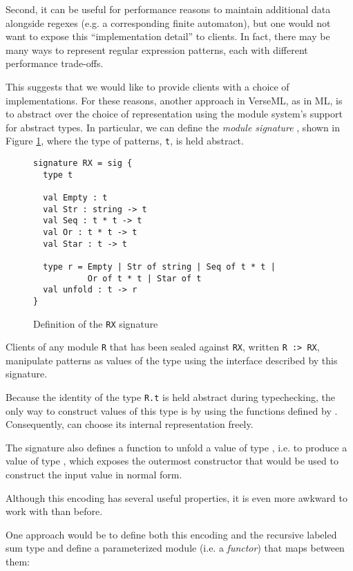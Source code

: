 {{Second, it can be useful for performance reasons to maintain additional data alongside regexes (e.g. a corresponding finite automaton), but one would not want to expose this ``implementation detail'' to clients. In fact, there may be many ways to represent regular expression patterns, each with different performance trade-offs.

This suggests that we would like to provide clients with a choice of implementations. For these reasons, another approach in VerseML, as in ML, is to abstract over the choice of representation using  the module system's support for abstract types. In particular, we can define the \emph{module signature} , shown in Figure \ref{fig:signature-RX}, where the type of patterns, \lstinline{t}, is held abstract.

\begin{figure}[ht]
\begin{lstlisting}[deletekeywords={case},numbers=none]
signature RX = sig {
  type t

  val Empty : t
  val Str : string -> t
  val Seq : t * t -> t
  val Or : t * t -> t
  val Star : t -> t

  type r = Empty | Str of string | Seq of t * t | 
           Or of t * t | Star of t
  val unfold : t -> r
}
\end{lstlisting}
\caption{Definition of the \lstinline{RX} signature}
\label{fig:signature-RX}
\end{figure}

 Clients of any module \lstinline{R} that has been sealed against \lstinline{RX}, written \lstinline{R :> RX}, manipulate patterns as values of the type  using the interface described by this signature. 

 Because the identity of the type \lstinline{R.t} is held abstract  during typechecking, the only way to construct values of this type is by using the functions defined by . Consequently,  can  choose its internal representation freely. 

 The signature also defines a function  to unfold a value of type , i.e. to produce a value of type , which exposes the outermost constructor that would be used to construct the input value in normal form.

 Although this encoding has several useful properties, it is even more awkward to work with than before.

One approach would be to define both this encoding and the recursive labeled sum type  and define a parameterized module (i.e. a \emph{functor}) that maps between them: 

}}
